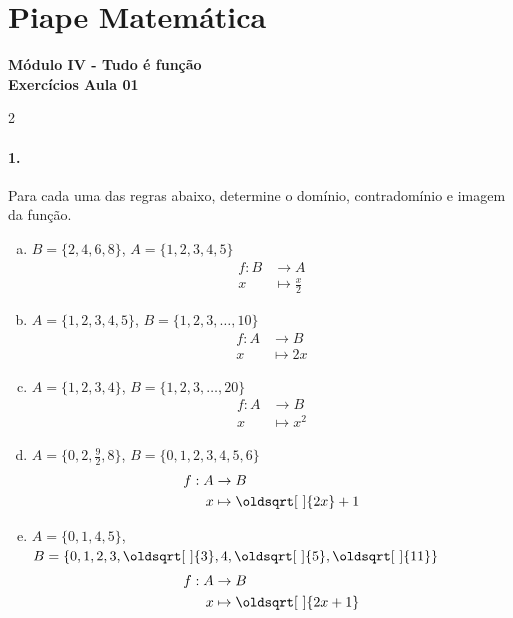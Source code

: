 \documentclass[a4paper,12pt]{article}
\renewcommand*{\sqrt}[2][\ ]{\oldsqrt[#1]{#2}}
\begin{document}
 
  
\section*{Piape Matemática} 
\textbf{Módulo IV - Tudo é função}\\
\textbf{Exercícios Aula 01}         
\begin{multicols}{2} 

\paragraph*{1.} Para cada uma das regras abaixo, determine o domínio, contradomínio e imagem da função.
\begin{enumerate}[a)]
    \item $B = \{2,4,6,8\}$, $A = \{1,2,3,4,5\}$
    $$\begin{aligned}
        f:B&\to A\\
        x&\mapsto \frac{x}{2}
    \end{aligned}$$

    \item $A = \{1,2,3,4,5\}$, $B = \{1,2,3,\ldots, 10\}$
    $$\begin{aligned}
        f:A&\to B\\
        x&\mapsto 2x
    \end{aligned}$$
    
    \item $A = \{1, 2, 3, 4\}$, $B = \{1, 2, 3, \ldots, 20\}$
    $$\begin{aligned}
        f:A&\to B\\
        x&\mapsto x^2
    \end{aligned}$$

    \item $A = \{0, 2, \tfrac{9}{2}, 8\}$, $B = \{0,1,2,3,4,5,6\}$
    $$\begin{aligned}
        f:A&\to B\\
        x&\mapsto \sqrt{2x} + 1
    \end{aligned}$$

    \item $A = \{0, 1, 4, 5\}$,\\ $B = \{0,1,2,3,\sqrt{3},4,\sqrt{5},\sqrt{11}\}$
    $$\begin{aligned}
        f:A&\to B\\
        x&\mapsto \sqrt{2x+ 1}
    \end{aligned}$$

\end{enumerate}


\end{multicols}
\end{document}
